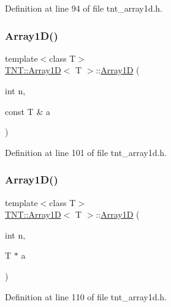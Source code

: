 Definition at line 94 of file tnt\+\_\+array1d.\+h.

\mbox{\label{classTNT_1_1Array1D_adfcc1fa364923b4fccc20b5e2df39902}} 
\subsubsection{\texorpdfstring{Array1\+D()}{Array1D()}\hspace{0.1cm}{\footnotesize\ttfamily [3/5]}}
{\footnotesize\ttfamily template$<$class T$>$ \\
\hyperlink{classTNT_1_1Array1D}{T\+N\+T\+::\+Array1D}$<$ T $>$\+::\hyperlink{classTNT_1_1Array1D}{Array1D} (\begin{DoxyParamCaption}\item[{int}]{n,  }\item[{const T \&}]{a }\end{DoxyParamCaption})}



Definition at line 101 of file tnt\+\_\+array1d.\+h.

\mbox{\label{classTNT_1_1Array1D_a1db0c6d3a77baacb01cd6fd89e86f342}} 
\subsubsection{\texorpdfstring{Array1\+D()}{Array1D()}\hspace{0.1cm}{\footnotesize\ttfamily [4/5]}}
{\footnotesize\ttfamily template$<$class T$>$ \\
\hyperlink{classTNT_1_1Array1D}{T\+N\+T\+::\+Array1D}$<$ T $>$\+::\hyperlink{classTNT_1_1Array1D}{Array1D} (\begin{DoxyParamCaption}\item[{int}]{n,  }\item[{T $\ast$}]{a }\end{DoxyParamCaption})}



Definition at line 110 of file tnt\+\_\+array1d.\+h.

\mbox{\label{classTNT_1_1Array1D_a9d1bf5c40c8d7a591d20134ff5561817}} 

